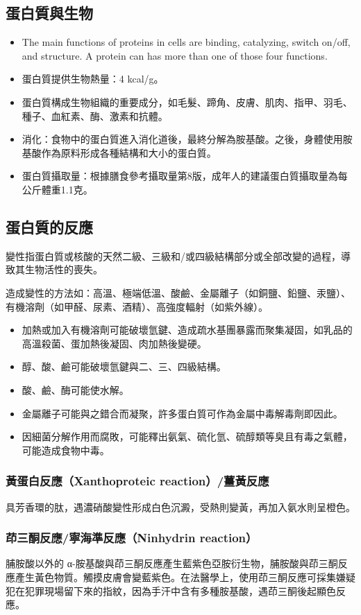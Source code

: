 \documentclass[a4paper,12pt]{report}
\begin{document}
\begin{itemize}
\begin{itemize}
\subsection{蛋白質與生物}
\begin{itemize}
\item The main functions of proteins in cells are binding, catalyzing, switch on/off, and structure. A protein can has more than one of those four functions.
\item 蛋白質提供生物熱量：4 kcal/g。
\item 蛋白質構成生物組織的重要成分，如毛髮、蹄角、皮膚、肌肉、指甲、羽毛、種子、血紅素、酶、激素和抗體。
\item 消化：食物中的蛋白質進入消化道後，最終分解為胺基酸。之後，身體使用胺基酸作為原料形成各種結構和大小的蛋白質。
\item 蛋白質攝取量：根據膳食參考攝取量第8版，成年人的建議蛋白質攝取量為每公斤體重1.1克。
\end{itemize}
\subsection{蛋白質的反應}
變性指蛋白質或核酸的天然二級、三級和/或四級結構部分或全部改變的過程，導致其生物活性的喪失。

造成變性的方法如：高溫、極端低溫、酸鹼、金屬離子（如銅鹽、鉛鹽、汞鹽）、有機溶劑（如甲醛、尿素、酒精）、高強度輻射（如紫外線）。
\begin{itemize}
\item 加熱或加入有機溶劑可能破壞氫鍵、造成疏水基團暴露而聚集凝固，如乳品的高溫殺菌、蛋加熱後凝固、肉加熱後變硬。
\item 醇、酸、鹼可能破壞氫鍵與二、三、四級結構。
\item 酸、鹼、酶可能使水解。
\item 金屬離子可能與之錯合而凝聚，許多蛋白質可作為金屬中毒解毒劑即因此。
\item 因細菌分解作用而腐敗，可能釋出氨氣、硫化氫、硫醇類等臭且有毒之氣體，可能造成食物中毒。
\end{itemize}
\subsubsection{黃蛋白反應（Xanthoproteic reaction）/薑黃反應}
具芳香環的肽，遇濃硝酸變性形成白色沉澱，受熱則變黃，再加入氨水則呈橙色。
\subsubsection{茚三酮反應/寧海準反應（Ninhydrin reaction）}
脯胺酸以外的 α-胺基酸與茚三酮反應產生藍紫色亞胺衍生物，脯胺酸與茚三酮反應產生黃色物質。觸摸皮膚會變藍紫色。在法醫學上，使用茚三酮反應可採集嫌疑犯在犯罪現場留下來的指紋，因為手汗中含有多種胺基酸，遇茚三酮後起顯色反應。

\end{itemize}
\end{itemize}
\end{document}
